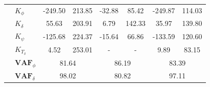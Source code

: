 \begin{table}[]
\begin{tabular}{llcccccc}
                                                   & $K_{\phi} $                                            & -249.50                                     & 213.85                                               & -32.88                                      & 85.42                                                & -249.87                                     & 114.03                                               \\
                                                   & $K_\delta $                                            & 55.63                                       & 203.91                                               & 6.79                                        & 142.33                                               & 35.97                                       & 139.80                                               \\
                                                   & $K_\psi $                                              & -125.68                                     & 224.37                                               & -15.64                                      & 66.86                                                & -133.59                                     & 120.60                                               \\
                                                   & $K_{T_\delta}$                                         & 4.52                                        & 253.01                                               & -                                           & -                                                    & 9.89                                        & 83.15                                                \\ \cline{2-8} 
                                                   & $\mathbf{VAF}_\phi$                                    & \multicolumn{2}{c}{81.64}                                                                          & \multicolumn{2}{c}{86.19}                                                                          & \multicolumn{2}{c}{83.39}                                                                          \\
                                                   & $\mathbf{VAF}_\delta$                                  & \multicolumn{2}{c}{98.02}                                                                          & \multicolumn{2}{c}{80.82}                                                                          & \multicolumn{2}{c}{97.11}                                                                          \\

\end{tabular}
\end{table}
